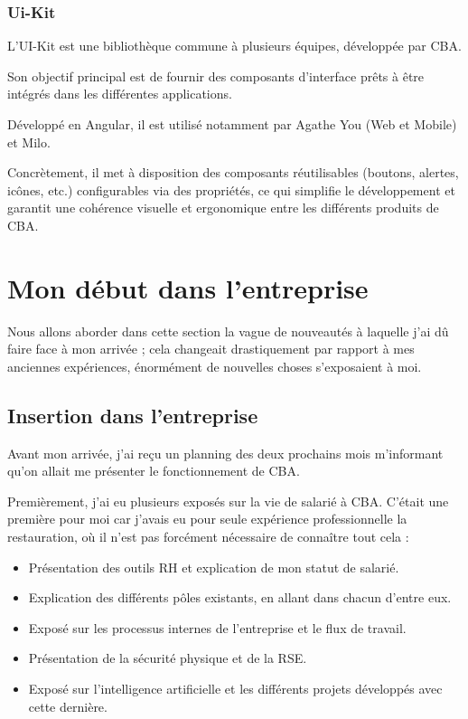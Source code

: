 \documentclass{article}
\begin{document}
\subsubsection{Ui-Kit}

L'UI-Kit est une bibliothèque commune à plusieurs équipes, développée par CBA.

Son objectif principal est de fournir des composants d'interface prêts à être intégrés dans les différentes applications.

Développé en Angular, il est utilisé notamment par Agathe You (Web et Mobile) et Milo.

Concrètement, il met à disposition des composants réutilisables (boutons, alertes, icônes, etc.) configurables via des propriétés, ce qui simplifie le développement et garantit une cohérence visuelle et ergonomique entre les différents produits de CBA.

\newpage

\section{Mon début dans l'entreprise}

Nous allons aborder dans cette section la vague de nouveautés à laquelle j'ai dû faire face à mon arrivée ; cela changeait drastiquement par rapport à mes anciennes expériences, énormément de nouvelles choses s'exposaient à moi.

\subsection{Insertion dans l'entreprise}

Avant mon arrivée, j'ai reçu un planning des deux prochains mois m'informant qu'on allait me présenter le fonctionnement de CBA.

Premièrement, j'ai eu plusieurs exposés sur la vie de salarié à CBA. C'était une première pour moi car j'avais eu pour seule expérience professionnelle la restauration, où il n'est pas forcément nécessaire de connaître tout cela :

\begin{itemize}
    \item Présentation des outils RH et explication de mon statut de salarié.
    \item Explication des différents pôles existants, en allant dans chacun d'entre eux.
    \item Exposé sur les processus internes de l'entreprise et le flux de travail.
    \item Présentation de la sécurité physique et de la RSE.
    \item Exposé sur l'intelligence artificielle et les différents projets développés avec cette dernière.
\end{itemize}
\end{document}
